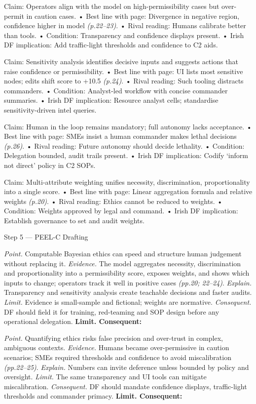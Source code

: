 Claim: Operators align with the model on high-permissibility cases but over-permit in caution cases.
• Best line with page: Divergence in negative region, confidence higher in model \emph{(p.22–23)}.
• Rival reading: Humans calibrate better than tools.
• Condition: Transparency and confidence displays present.
• Irish DF implication: Add traffic-light thresholds and confidence to C2 aids.

Claim: Sensitivity analysis identifies decisive inputs and suggests actions that raise confidence or permissibility.
• Best line with page: UI lists most sensitive nodes; edits shift score to +10.5 \emph{(p.24)}.
• Rival reading: Such tooling distracts commanders.
• Condition: Analyst-led workflow with concise commander summaries.
• Irish DF implication: Resource analyst cells; standardise sensitivity-driven intel queries.

Claim: Human in the loop remains mandatory; full autonomy lacks acceptance.
• Best line with page: SMEs insist a human commander makes lethal decisions \emph{(p.26)}.
• Rival reading: Future autonomy should decide lethality.
• Condition: Delegation bounded, audit trails present.
• Irish DF implication: Codify ‘inform not direct’ policy in C2 SOPs.

Claim: Multi-attribute weighting unifies necessity, discrimination, proportionality into a single score.
• Best line with page: Linear aggregation formula and relative weights \emph{(p.20)}.
• Rival reading: Ethics cannot be reduced to weights.
• Condition: Weights approved by legal and command.
• Irish DF implication: Establish governance to set and audit weights.

Step 5 — PEEL-C Drafting

\textit{Point.} Computable Bayesian ethics can speed and structure human judgement without replacing it.
\textit{Evidence.} The model aggregates necessity, discrimination and proportionality into a permissibility score, exposes weights, and shows which inputs to change; operators track it well in positive cases \emph{(pp.20; 22–24)}.
\textit{Explain.} Transparency and sensitivity analysis create teachable decisions and faster audits.
\textit{Limit.} Evidence is small-sample and fictional; weights are normative.
\textit{Consequent.} DF should field it for training, red-teaming and SOP design before any operational delegation. \textbf{Limit. Consequent:}

\textit{Point.} Quantifying ethics risks false precision and over-trust in complex, ambiguous contexts.
\textit{Evidence.} Humans became over-permissive in caution scenarios; SMEs required thresholds and confidence to avoid miscalibration \emph{(pp.22–25)}.
\textit{Explain.} Numbers can invite deference unless bounded by policy and oversight.
\textit{Limit.} The same transparency and UI tools can mitigate miscalibration.
\textit{Consequent.} DF should mandate confidence displays, traffic-light thresholds and commander primacy. \textbf{Limit. Consequent:}

